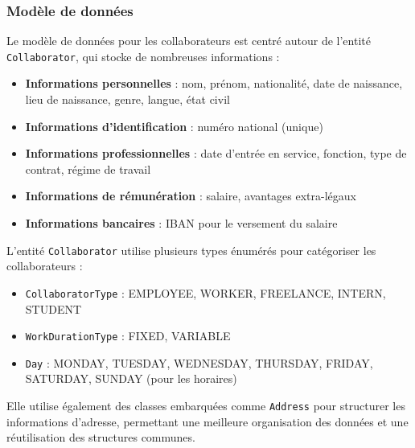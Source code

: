 \subsubsection{Modèle de données}

Le modèle de données pour les collaborateurs est centré autour de l'entité \texttt{Collaborator}, qui stocke de nombreuses informations :

\vspace{0.5cm}

\begin{itemize}[leftmargin=*,label=\textcolor{darkgray}{$\bullet$},itemsep=0.3em]
  \item \textbf{Informations personnelles} : nom, prénom, nationalité, date de naissance, lieu de naissance, genre, langue, état civil
  \item \textbf{Informations d'identification} : numéro national (unique)
  \item \textbf{Informations professionnelles} : date d'entrée en service, fonction, type de contrat, régime de travail
  \item \textbf{Informations de rémunération} : salaire, avantages extra-légaux
  \item \textbf{Informations bancaires} : IBAN pour le versement du salaire
\end{itemize}

\vspace{0.5cm}

L'entité \texttt{Collaborator} utilise plusieurs types énumérés pour catégoriser les collaborateurs :
\begin{itemize}[leftmargin=*,label=\textcolor{darkgray}{$\bullet$},itemsep=0.3em]
  \item \texttt{CollaboratorType} : EMPLOYEE, WORKER, FREELANCE, INTERN, STUDENT
  \item \texttt{WorkDurationType} : FIXED, VARIABLE
  \item \texttt{Day} : MONDAY, TUESDAY, WEDNESDAY, THURSDAY, FRIDAY, SATURDAY, SUNDAY (pour les horaires)
\end{itemize}

\vspace{0.5cm}

\begin{note}
Elle utilise également des classes embarquées comme \texttt{Address} pour structurer les informations d'adresse, permettant une meilleure organisation des données et une réutilisation des structures communes.
\end{note}

